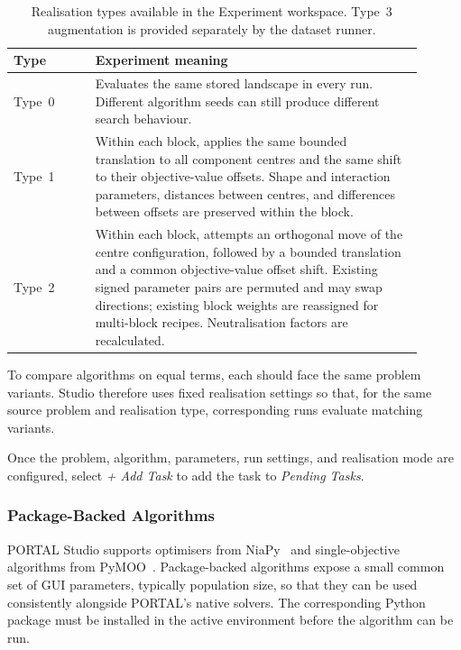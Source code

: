 \documentclass[journal,onecolumn]{IEEEtran}
\begin{document}
\begin{table}[H]
\centering
\small
\caption{Realisation types available in the Experiment workspace. Type~3 augmentation is provided separately by the dataset runner.}
\label{tab:manual:realisation-types}
\begin{tabular}{@{}p{0.18\linewidth}p{0.72\linewidth}@{}}
\toprule
\textbf{Type} & \textbf{Experiment meaning} \\
\midrule
Type~0 & Evaluates the same stored landscape in every run. Different algorithm seeds can still produce different search behaviour. \\
Type~1 & Within each block, applies the same bounded translation to all component centres and the same shift to their objective-value offsets. Shape and interaction parameters, distances between centres, and differences between offsets are preserved within the block. \\
Type~2 & Within each block, attempts an orthogonal move of the centre configuration, followed by a bounded translation and a common objective-value offset shift. Existing signed parameter pairs are permuted and may swap directions; existing block weights are reassigned for multi-block recipes. Neutralisation factors are recalculated. \\
\bottomrule
\end{tabular}
\end{table}

To compare algorithms on equal terms, each should face the same problem variants. Studio therefore uses fixed realisation settings so that, for the same source problem and realisation type, corresponding runs evaluate matching variants.

Once the problem, algorithm, parameters, run settings, and realisation mode are configured, select \emph{+ Add Task} to add the task to \emph{Pending Tasks}.

\subsubsection{Package-Backed Algorithms}
\label{sssec:manual:experimental-package-algorithms}

PORTAL Studio supports optimisers from NiaPy~\cite{niapyjoss} and single-objective algorithms from PyMOO~\cite{blank2020pymoo}. Package-backed algorithms expose a small common set of GUI parameters, typically population size, so that they can be used consistently alongside PORTAL's native solvers. The corresponding Python package must be installed in the active environment before the algorithm can be run.
\end{document}

